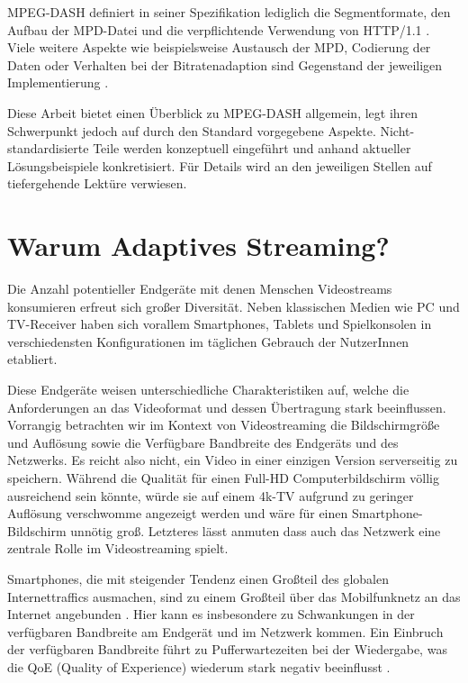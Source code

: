 \documentclass[paper = a4, fontsize = 12pt, parskip = half]{scrartcl} %
\begin{document}
MPEG-DASH definiert in seiner Spezifikation lediglich die Segmentformate, den Aufbau der MPD-Datei und die verpflichtende Verwendung von HTTP/1.1 \cite{mpeg_dynamic_2013}. Viele weitere Aspekte wie beispielsweise Austausch der MPD, Codierung der Daten oder Verhalten bei der Bitratenadaption sind Gegenstand der jeweiligen Implementierung \cite{sodagar_mpeg-dash_2011}.

Diese Arbeit bietet einen Überblick zu MPEG-DASH allgemein, legt ihren Schwerpunkt jedoch auf durch den Standard vorgegebene Aspekte.
Nicht-standardisierte Teile werden konzeptuell eingeführt und anhand aktueller Lösungsbeispiele konkretisiert. Für Details wird an den jeweiligen Stellen auf tiefergehende Lektüre verwiesen.

\section{Warum Adaptives Streaming?}
Die Anzahl potentieller Endgeräte mit denen Menschen Videostreams konsumieren erfreut sich großer Diversität. Neben klassischen Medien wie PC und TV-Receiver haben sich vorallem Smartphones, Tablets und Spielkonsolen in verschiedensten Konfigurationen im täglichen Gebrauch der NutzerInnen etabliert.

Diese Endgeräte weisen unterschiedliche Charakteristiken auf, welche die Anforderungen an das Videoformat und dessen Übertragung stark beeinflussen. Vorrangig betrachten wir im Kontext von Videostreaming die Bildschirmgröße und Auflösung sowie die Verfügbare Bandbreite des Endgeräts und des Netzwerks.
Es reicht also nicht, ein Video in einer einzigen Version serverseitig zu speichern. Während die Qualität für einen Full-HD Computerbildschirm völlig ausreichend sein könnte, würde sie auf einem 4k-TV aufgrund zu geringer Auflösung verschwomme angezeigt werden und wäre für einen Smartphone-Bildschirm unnötig groß. Letzteres lässt anmuten dass auch das Netzwerk eine zentrale Rolle im Videostreaming spielt.

Smartphones, die mit steigender Tendenz einen Großteil des globalen Internettraffics ausmachen, sind zu einem Großteil über das Mobilfunknetz an das Internet angebunden \cite{cisco_syst_inc_cisco_2017}. Hier kann es insbesondere zu Schwankungen in der verfügbaren Bandbreite am Endgerät und im Netzwerk kommen. Ein Einbruch der verfügbaren Bandbreite führt zu Pufferwartezeiten bei der Wiedergabe, was die QoE (Quality of Experience) wiederum stark negativ beeinflusst \cite{seufert_survey_2015}.
\end{document}
